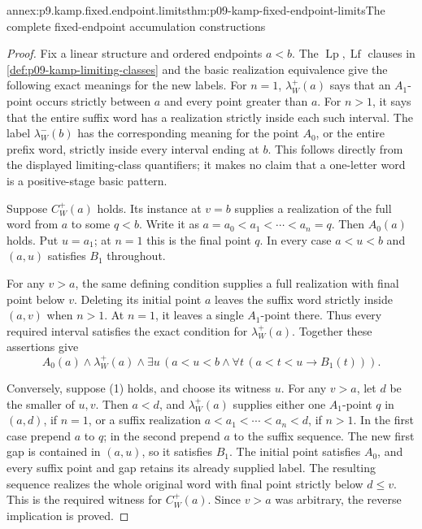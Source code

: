 \begin{annexitem}{annex:p9.kamp.fixed.endpoint.limits}{thm:p09-kamp-fixed-endpoint-limits}{The complete fixed-endpoint accumulation constructions}
\begin{proof}
Fix a linear structure and ordered endpoints \(a<b\).
The \(\operatorname{Lp},\operatorname{Lf}\) clauses in
\cref{def:p09-kamp-limiting-classes} and the basic realization
equivalence give the following exact meanings for the new labels.
For \(n=1\), \(\lambda_W^+(a)\) says that an
\(A_1\)-point occurs strictly between \(a\) and every point
greater than \(a\). For \(n>1\), it says that the entire
suffix word has a realization strictly inside each such interval.
The label \(\lambda_W^-(b)\) has the corresponding meaning
for the point \(A_0\), or the entire prefix word, strictly
inside every interval ending at \(b\). This follows directly
from the displayed limiting-class quantifiers; it makes no claim
that a one-letter word is a positive-stage basic pattern.

Suppose \(C_W^+(a)\) holds. Its instance at \(v=b\)
supplies a realization of the full word from \(a\) to some
\(q<b\). Write it as
\(a=a_0<a_1<\cdots<a_n=q\).
Then \(A_0(a)\) holds. Put \(u=a_1\); at \(n=1\)
this is the final point \(q\). In every case \(a<u<b\)
and \((a,u)\) satisfies \(B_1\) throughout.

For any \(v>a\), the same defining condition supplies a
full realization with final point below \(v\). Deleting its
initial point \(a\) leaves the suffix word strictly inside
\((a,v)\) when \(n>1\). At \(n=1\), it leaves a
single \(A_1\)-point there. Thus every required interval
satisfies the exact condition for \(\lambda_W^+(a)\).
Together these assertions give
\[
 A_0(a)\land\lambda_W^+(a)\land
       \exists u\,(a<u<b\land\forall t\,(a<t<u\to B_1(t))).
 \tag{1}
\]

Conversely, suppose (1) holds, and choose its witness \(u\).
For any \(v>a\), let \(d\) be the smaller of \(u,v\).
Then \(a<d\), and \(\lambda_W^+(a)\) supplies either
one \(A_1\)-point \(q\) in \((a,d)\), if \(n=1\),
or a suffix realization
\(a<a_1<\cdots<a_n<d\), if \(n>1\).
In the first case prepend \(a\) to \(q\); in the second
prepend \(a\) to the suffix sequence. The new first gap is
contained in \((a,u)\), so it satisfies \(B_1\).
The initial point satisfies \(A_0\), and every suffix point
and gap retains its already supplied label. The resulting sequence
realizes the whole original word with final point strictly below
\(d\leq v\). This is the required witness for
\(C_W^+(a)\). Since \(v>a\) was arbitrary, the reverse
implication is proved.


\end{proof}
\end{annexitem}

